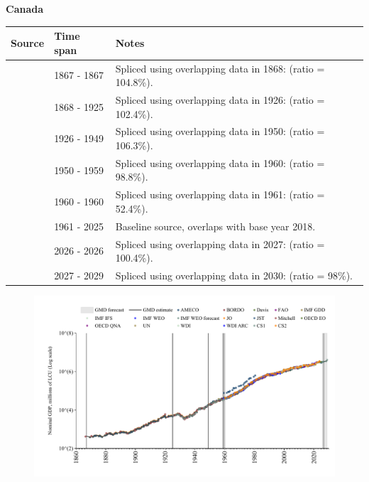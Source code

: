 \documentclass[12pt,a4paper,landscape]{article}
\begin{document}
\begin{adjustbox}{max totalsize={\paperwidth}{\paperheight},center}
\begin{minipage}[t][\textheight][t]{\textwidth}
\vspace*{0.5cm}
{}
\begin{center}
{\Large\bfseries Canada}
\end{center}
\vspace{0.5cm}
\begin{table}[H]
\centering
\small
\begin{tabular}{|l|l|l|}
\hline
\textbf{Source} & \textbf{Time span} & \textbf{Notes} \\
\hline
\rowcolor{white}\cite{Mitchell}& 1867 - 1867 &Spliced using overlapping data in 1868: (ratio = 104.8\%).\\
\rowcolor{lightgray}\cite{JST}& 1868 - 1925 &Spliced using overlapping data in 1926: (ratio = 102.4\%).\\
\rowcolor{white}\cite{CS1_CAN}& 1926 - 1949 &Spliced using overlapping data in 1950: (ratio = 106.3\%).\\
\rowcolor{lightgray}\cite{IMF_GDD}& 1950 - 1959 &Spliced using overlapping data in 1960: (ratio = 98.8\%).\\
\rowcolor{white}\cite{AMECO}& 1960 - 1960 &Spliced using overlapping data in 1961: (ratio = 52.4\%).\\
\rowcolor{lightgray}\cite{OECD_EO}& 1961 - 2025 &Baseline source, overlaps with base year 2018.\\
\rowcolor{white}\cite{AMECO}& 2026 - 2026 &Spliced using overlapping data in 2027: (ratio = 100.4\%).\\
\rowcolor{lightgray}\cite{IMF_WEO_forecast}& 2027 - 2029 &Spliced using overlapping data in 2030: (ratio = 98\%).\\
\hline
\end{tabular}
\end{table}
\begin{figure}[H]
\centering
\includegraphics[width=\textwidth,height=0.6\textheight,keepaspectratio]{graphs/CAN_nGDP.pdf}
\end{figure}
\end{minipage}
\end{adjustbox}
\end{document}

